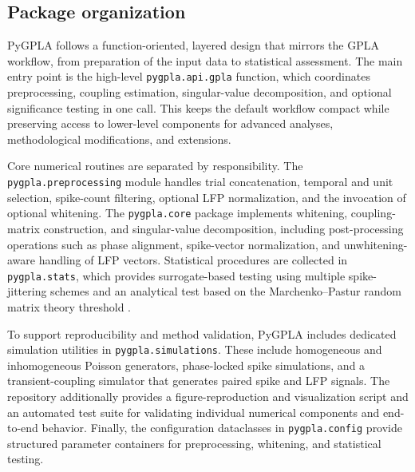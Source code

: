 \subsection{Package organization}

PyGPLA follows a function-oriented, layered design that mirrors the GPLA workflow,
from preparation of the input data to statistical assessment. The main entry point is
the high-level \texttt{pygpla.api.gpla} function, which coordinates preprocessing,
coupling estimation, singular-value decomposition, and optional significance testing
in one call. This keeps the default workflow compact while preserving access to
lower-level components for advanced analyses, methodological modifications, and
extensions.

Core numerical routines are separated by responsibility. The
\texttt{pygpla.preprocessing} module handles trial concatenation, temporal and unit
selection, spike-count filtering, optional LFP normalization, and the invocation of
optional whitening. The \texttt{pygpla.core} package implements whitening,
coupling-matrix construction, and singular-value decomposition, including
post-processing operations such as phase alignment, spike-vector normalization, and
unwhitening-aware handling of LFP vectors. Statistical procedures are collected in
\texttt{pygpla.stats}, which provides surrogate-based testing using multiple
spike-jittering schemes \citep[e.g., multiple jittering schemes; also, see][]{grun2009data}
and an analytical test based on the Marchenko--Pastur random matrix theory threshold
\citep{safaviUnivariateMultivariateCoupling2021}.

To support reproducibility and method validation, PyGPLA includes dedicated simulation
utilities in \texttt{pygpla.simulations}. These include homogeneous and inhomogeneous
Poisson generators, phase-locked spike simulations, and a transient-coupling simulator
that generates paired spike and LFP signals. The repository additionally provides a
figure-reproduction and visualization script and an automated test suite for validating
individual numerical components and end-to-end behavior. Finally, the configuration
dataclasses in \texttt{pygpla.config} provide structured parameter containers for
preprocessing, whitening, and statistical testing.

